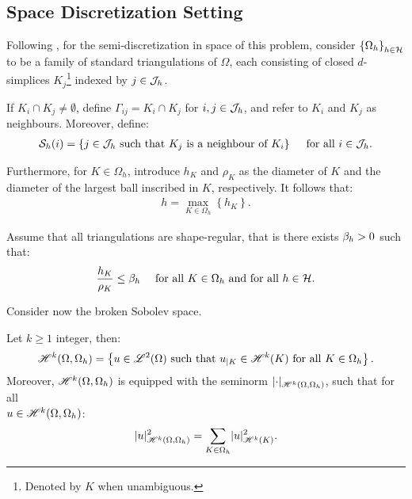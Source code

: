 \subsection{Space Discretization Setting}

Following \cite{Feistauer2004}, for the semi-discretization in space of this problem, consider $\left\{ \Omega_{h} \right\}_{h \in \mathcal{H}}$ to be a family of standard triangulations of $\Omega$, each consisting of closed $d$-simplices $K_j$\footnote{Denoted by $K$ when unambiguous.} indexed by $j \in \mathcal{J}_h$. %

If $K_i \cap K_j \neq \emptyset$, define $\Gamma_{ij} = K_i \cap K_j$ for $i, j \in \mathcal{J}_h$, and refer to $K_i$ and $K_j$ as neighbours. Moreover, define:
\begin{gather}
    \mathcal{S}_h(i) = \left\{ j \in \mathcal{J}_h \text{ such that } K_j \text{ is a neighbour of } K_i \right\} \quad \text{ for all } i \in \mathcal{J}_h.
\end{gather}

Furthermore, for $K \in \Omega_h$, introduce $h_K$ and $\rho_K$ as the diameter of $K$ and the diameter of the largest ball inscribed in $K$, respectively. It follows that:
\begin{gather}
    h = \max_{K \in \Omega_h} \left\{ h_K \right\}.
\end{gather}

Assume that all triangulations are shape-regular, that is there exists $\beta_{h} > 0$ such that:
\begin{gather}
    \frac{h_K}{\rho_K} \leq \beta_{h} \quad \text{ for all } K \in \Omega_h \text{ and for all } h \in \mathcal{H}.
\end{gather}

Consider now the broken Sobolev space.
\begin{definition} %
    Let $k \geq 1$ integer, then:
    \begin{gather}
        \mathscr{H}^{k}(\Omega, \Omega_h) = \left\{ u \in \mathscr{L}^{2}(\Omega) \text{ such that } u_{\mid K} \in \mathscr{H}^{k}(K) \text{ for all } K \in \Omega_h \right\}.
    \end{gather}
    Moreover, $\mathscr{H}^{k}(\Omega, \Omega_h)$ is equipped with the seminorm $\lvert \cdot \rvert_{\mathscr{H}^{k}(\Omega, \Omega_h)}$, such that for all \\ $u \in \mathscr{H}^{k}(\Omega, \Omega_h)$:
    \begin{gather}
        \lvert u \rvert_{\mathscr{H}^{k}(\Omega, \Omega_h)}^2 = \sum_{K \in \Omega_h} \lvert u \rvert_{\mathscr{H}^{k}(K)}^2.
    \end{gather}
\end{definition}

